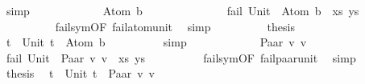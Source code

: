 \begin{isabellebody}
\ simp\isanewline
\ \ \ \ \isamarkupfalse%
\isanewline
\ \ \ \ \ \ \isamarkupfalse%
\ {\isacharparenleft}{\kern0pt}Atom\ b{\isacharparenright}{\kern0pt}\isanewline
\ \ \ \ \ \ %
\isanewline
\ \ \ \ \ \ \isamarkupfalse%
\ {\isachardoublequoteopen}fail\ {\isacharparenleft}{\kern0pt}{\isacharparenleft}{\kern0pt}Unit\ {\isasymapprox}{\isacharquery}{\kern0pt}\ Atom\ b{\isacharparenright}{\kern0pt}\ {\isacharhash}{\kern0pt}\ xs{\isacharcomma}{\kern0pt}\ ys{\isacharparenright}{\kern0pt}{\isachardoublequoteclose}\isanewline
\ \ \ \ \ \ \ \ \isamarkupfalse%
\ fail{\isacharunderscore}{\kern0pt}sym{\isacharbrackleft}{\kern0pt}OF\ fail{\isacharunderscore}{\kern0pt}atom{\isacharunderscore}{\kern0pt}unit{\isacharbrackright}{\kern0pt}\ \isamarkupfalse%
\ simp\isanewline
\ \ \ \ \ \ \isamarkupfalse%
\ \isamarkupfalse%
\ {\isacharquery}{\kern0pt}thesis\ \isamarkupfalse%
\ {\isacartoucheopen}t{}\ {\isacharequal}{\kern0pt}\ Unit{\isacartoucheclose}\ {\isacartoucheopen}t{}\ {\isacharequal}{\kern0pt}\ Atom\ b{\isacartoucheclose}\isanewline
\ \ \ \ \ \ \ \ \isamarkupfalse%
\ simp\isanewline
\ \ \ \ \isamarkupfalse%
\isanewline
\ \ \ \ \ \ \isamarkupfalse%
\ {\isacharparenleft}{\kern0pt}Paar\ v{}\ v{}{\isacharparenright}{\kern0pt}\isanewline
\ \ \ \ \ \ %
\isanewline
\ \ \ \ \ \ \isamarkupfalse%
\ {\isachardoublequoteopen}fail\ {\isacharparenleft}{\kern0pt}{\isacharparenleft}{\kern0pt}Unit\ {\isasymapprox}{\isacharquery}{\kern0pt}\ Paar\ v{}\ v{}{\isacharparenright}{\kern0pt}\ {\isacharhash}{\kern0pt}\ xs{\isacharcomma}{\kern0pt}\ ys{\isacharparenright}{\kern0pt}{\isachardoublequoteclose}\isanewline
\ \ \ \ \ \ \ \ \isamarkupfalse%
\ fail{\isacharunderscore}{\kern0pt}sym{\isacharbrackleft}{\kern0pt}OF\ fail{\isacharunderscore}{\kern0pt}paar{\isacharunderscore}{\kern0pt}unit{\isacharbrackright}{\kern0pt}\ \isamarkupfalse%
\ simp\isanewline
\ \ \ \ \ \ \isamarkupfalse%
\ \isamarkupfalse%
\ {\isacharquery}{\kern0pt}thesis\ \isamarkupfalse%
\ {\isacartoucheopen}t{}\ {\isacharequal}{\kern0pt}\ Unit{\isacartoucheclose}\ {\isacartoucheopen}t{}\ {\isacharequal}{\kern0pt}\ Paar\ v{}\ v{}{\isacartoucheclose}\isanewline

\end{isabellebody}
